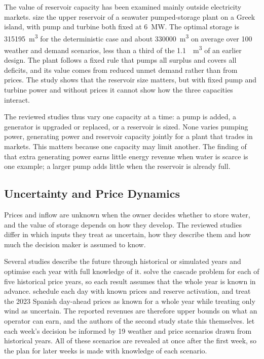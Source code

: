 The value of reservoir capacity has been examined mainly outside
electricity markets. \citet{zisos2023mixing} size the upper reservoir of
a seawater pumped-storage plant on a Greek island, with pump and turbine
both fixed at \SI{6}{\mega\watt}. The optimal storage is
\SI{315195}{\cubic\metre} for the deterministic case and about
\SI{330000}{\cubic\metre} on average over 100 weather and demand
scenarios, less than a third of the
\SI{1.1}{\mega\cubic\metre} of an earlier design. The plant follows a
fixed rule that pumps all surplus and covers all deficits, and its value
comes from reduced unmet demand rather than from prices. The study shows
that the reservoir size matters, but with fixed pump and turbine power
and without prices it cannot show how the three capacities interact.

The reviewed studies thus vary one capacity at a time: a pump is added,
a generator is upgraded or replaced, or a reservoir is sized. None
varies pumping power, generating power and reservoir capacity jointly
for a plant that trades in markets. This matters because one capacity
may limit another. The finding of \citet{bore2026assessing} that extra
generating power earns little energy revenue when water is scarce is one
example; a larger pump adds little when the reservoir is already full.

\subsection{Uncertainty and Price Dynamics}
\label{sec:lit_uncertainty}

Prices and inflow are unknown when the owner decides whether to store
water, and the value of storage depends on how they develop. The
reviewed studies differ in which inputs they treat as uncertain, how
they describe them and how much the decision maker is assumed to know.

Several studies describe the future through historical or simulated
years and optimise each year with full knowledge of it.
\citet{ak2019quantifying} solve the cascade problem for each of five
historical price years, so each result assumes that the whole year is
known in advance. \citet{chazarra2017} schedule each day with known
prices and reserve activation, and \citet{naval2025optimization} treat
the 2023 Spanish day-ahead prices as known for a whole year while
treating only wind as uncertain. The reported revenues are therefore
upper bounds on what an operator can earn, and the authors of the
second study state this themselves. \citet{helseth2017} let each week's
decision be informed by 19 weather and price scenarios drawn from
historical years. All of these scenarios are revealed at once after the
first week, so the plan for later weeks is made with knowledge of each
scenario.

